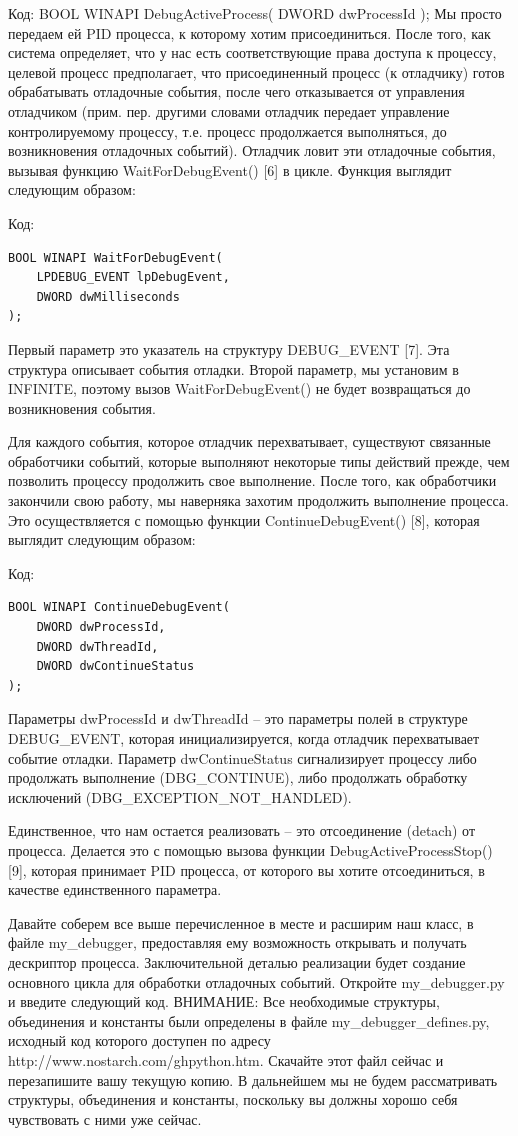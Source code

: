 \documentclass[12pt]{book}
\begin{document}
Код:
BOOL WINAPI DebugActiveProcess(
    DWORD dwProcessId
);
Мы просто передаем ей PID процесса, к которому хотим присоединиться. После того, как система определяет, что у нас есть соответствующие права доступа к процессу, целевой процесс предполагает, что присоединенный процесс (к отладчику) готов обрабатывать отладочные события, после чего отказывается от управления отладчиком (прим. пер. другими словами отладчик передает управление контролируемому процессу, т.е. процесс продолжается выполняться, до возникновения отладочных событий). Отладчик ловит эти отладочные события, вызывая функцию WaitForDebugEvent() [6] в цикле. Функция выглядит следующим образом:

Код:
\begin{lstlisting}
BOOL WINAPI WaitForDebugEvent(
    LPDEBUG_EVENT lpDebugEvent,
    DWORD dwMilliseconds
);
\end{lstlisting}

Первый параметр это указатель на структуру DEBUG\_EVENT [7]. Эта структура описывает события отладки. Второй параметр, мы установим в INFINITE, поэтому вызов WaitForDebugEvent() не будет возвращаться до возникновения события.

Для каждого события, которое отладчик перехватывает, существуют связанные обработчики событий, которые выполняют некоторые типы действий прежде, чем позволить процессу продолжить свое выполнение. После того, как обработчики закончили свою работу, мы наверняка захотим продолжить выполнение процесса. Это осуществляется с помощью функции ContinueDebugEvent() [8], которая выглядит следующим образом: 

Код:
\begin{lstlisting}
BOOL WINAPI ContinueDebugEvent(
    DWORD dwProcessId,
    DWORD dwThreadId,
    DWORD dwContinueStatus
);
\end{lstlisting}

Параметры dwProcessId и dwThreadId – это параметры полей в структуре DEBUG\_EVENT, которая инициализируется, когда отладчик перехватывает событие отладки. Параметр dwContinueStatus сигнализирует процессу либо продолжать выполнение (DBG\_CONTINUE), либо продолжать обработку исключений (DBG\_EXCEPTION\_NOT\_HANDLED).

Единственное, что нам остается реализовать – это отсоединение (detach) от процесса. Делается это с помощью вызова функции DebugActiveProcessStop() [9], которая принимает PID процесса, от которого вы хотите отсоединиться, в качестве единственного параметра.

Давайте соберем все выше перечисленное в месте и расширим наш класс, в файле my\_debugger, предоставляя ему возможность открывать и получать дескриптор процесса. Заключительной деталью реализации будет создание основного цикла для обработки отладочных событий. Откройте my\_debugger.py и введите следующий код.
ВНИМАНИЕ: Все необходимые структуры, объединения и константы были определены в файле my\_debugger\_defines.py, исходный код которого доступен по адресу http://www.nostarch.com/ghpython.htm. Скачайте этот файл сейчас и перезапишите вашу текущую копию. В дальнейшем мы не будем рассматривать структуры, объединения и константы, поскольку вы должны хорошо себя чувствовать с ними уже сейчас.
\end{document}
